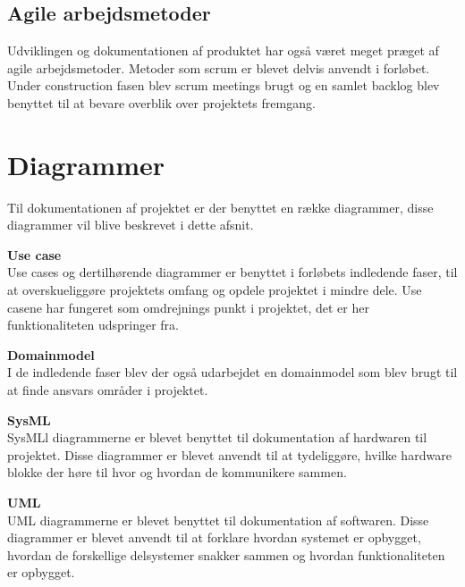 \subsection{Agile arbejdsmetoder}
Udviklingen og dokumentationen af produktet har også været meget præget af agile arbejdsmetoder. Metoder som scrum er blevet delvis anvendt i forløbet. Under construction fasen blev scrum meetings brugt og en samlet backlog blev benyttet til at bevare overblik over projektets fremgang.

\section{Diagrammer}
Til dokumentationen af projektet er der benyttet en række diagrammer, disse diagrammer vil blive beskrevet i dette afsnit.

\textbf{Use case}\\
Use cases og dertilhørende diagrammer er benyttet i forløbets indledende faser, til at overskueliggøre projektets omfang og opdele projektet i mindre dele. Use casene har fungeret som omdrejnings punkt i projektet, det er her funktionaliteten udspringer fra.

\textbf{Domainmodel}\\
I de indledende faser blev der også udarbejdet en domainmodel som blev brugt til at finde ansvars områder i projektet.

\textbf{SysML}\\
SysMLl diagrammerne er blevet benyttet til dokumentation af hardwaren til projektet. Disse diagrammer er blevet anvendt til at tydeliggøre, hvilke hardware blokke der høre til hvor og hvordan de kommunikere sammen.  

\textbf{UML}\\
UML diagrammerne er blevet  benyttet til dokumentation af softwaren. Disse diagrammer er blevet anvendt til at forklare hvordan systemet er opbygget, hvordan de forskellige delsystemer snakker sammen og hvordan funktionaliteten er opbygget.